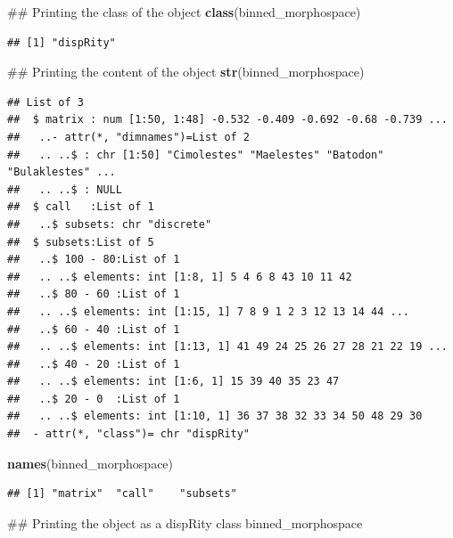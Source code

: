 \documentclass[]{book}
\newenvironment{Shaded}{\begin{snugshade}}{\end{snugshade}}
\newcommand{\KeywordTok}[1]{\textcolor[rgb]{0.13,0.29,0.53}{\textbf{#1}}}
\newcommand{\NormalTok}[1]{#1}
\theoremstyle{definition}
\theoremstyle{definition}
\theoremstyle{remark}
\begin{document}
\begin{Shaded}
\begin{Highlighting}[]
\NormalTok{## Printing the class of the object}
\KeywordTok{class}\NormalTok{(binned_morphospace)}
\end{Highlighting}
\end{Shaded}

\begin{verbatim}
## [1] "dispRity"
\end{verbatim}

\begin{Shaded}
\begin{Highlighting}[]
\NormalTok{## Printing the content of the object}
\KeywordTok{str}\NormalTok{(binned_morphospace)}
\end{Highlighting}
\end{Shaded}

\begin{verbatim}
## List of 3
##  $ matrix : num [1:50, 1:48] -0.532 -0.409 -0.692 -0.68 -0.739 ...
##   ..- attr(*, "dimnames")=List of 2
##   .. ..$ : chr [1:50] "Cimolestes" "Maelestes" "Batodon" "Bulaklestes" ...
##   .. ..$ : NULL
##  $ call   :List of 1
##   ..$ subsets: chr "discrete"
##  $ subsets:List of 5
##   ..$ 100 - 80:List of 1
##   .. ..$ elements: int [1:8, 1] 5 4 6 8 43 10 11 42
##   ..$ 80 - 60 :List of 1
##   .. ..$ elements: int [1:15, 1] 7 8 9 1 2 3 12 13 14 44 ...
##   ..$ 60 - 40 :List of 1
##   .. ..$ elements: int [1:13, 1] 41 49 24 25 26 27 28 21 22 19 ...
##   ..$ 40 - 20 :List of 1
##   .. ..$ elements: int [1:6, 1] 15 39 40 35 23 47
##   ..$ 20 - 0  :List of 1
##   .. ..$ elements: int [1:10, 1] 36 37 38 32 33 34 50 48 29 30
##  - attr(*, "class")= chr "dispRity"
\end{verbatim}

\begin{Shaded}
\begin{Highlighting}[]
\KeywordTok{names}\NormalTok{(binned_morphospace)}
\end{Highlighting}
\end{Shaded}

\begin{verbatim}
## [1] "matrix"  "call"    "subsets"
\end{verbatim}

\begin{Shaded}
\begin{Highlighting}[]
\NormalTok{## Printing the object as a dispRity class}
\NormalTok{binned_morphospace}
\end{Highlighting}
\end{Shaded}
\end{document}
